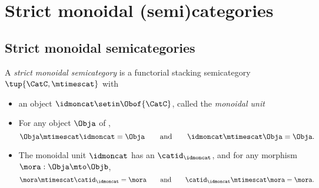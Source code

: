 
\section{Strict monoidal (semi)categories}

\subsection{Strict monoidal semicategories}

\begin{ctdefinition}
    \label{def:strict-monoidal-semicat}
    A \emph{strict monoidal semicategory} is a functorial stacking semicategory $\tup{\CatC, \mtimescat}$ with

    \constit

    \begin{itemize}
        \item an object $\idmoncat \setin \Obof{\CatC}$, called the \emph{monoidal unit}
    \end{itemize}

    \condit

    \begin{itemize}
        \item For any object $\Obja$ of \CatC,
              \begin{equation}
                  \Obja \mtimescat \idmoncat = \Obja \qquad \text{and} \qquad  \idmoncat \mtimescat  \Obja = \Obja.
              \end{equation}
        \item The monoidal unit $\idmoncat$ has an  $\catid_\idmoncat$, and for any morphism $\mora: \Obja \mto \Objb$,
              \begin{equation}
                  \mora \mtimescat \catid_\idmoncat = \mora \qquad \text{and} \qquad \catid_\idmoncat \mtimescat  \mora = \mora.
              \end{equation}
    \end{itemize}

\end{ctdefinition}



